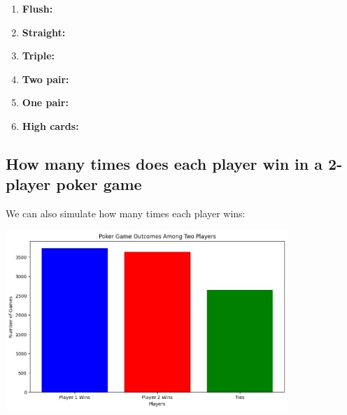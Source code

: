\documentclass{article}
\begin{document}
\begin{enumerate}
\[\begin{aligned}
{\begin{array}{l}
4 \\
1
\end{array}\right)\left[\left(\begin{array}{l}
4 \\
1
\end{array}\right)^4-3\right]} \\
& {[1277 \times 10 \times[6 \times 62+24 \times 63+6 \times 64]]} \\
& +\left[\left(\begin{array}{c}
13 \\
3
\end{array}\right)\left(\begin{array}{c}
4 \\
2
\end{array}\right)^3\left(\begin{array}{c}
40 \\
1
\end{array}\right)\right] \\
&
\end{aligned}
    \]
    \item \textbf{Flush:}
    \item \textbf{Straight:}
    \item \textbf{Triple:}
    \item \textbf{Two pair:}
    \item \textbf{One pair:}
    \item \textbf{High cards:}
\end{enumerate}



\subsection*{How many times does each player win in a 2-player poker game}

We can also simulate how many times each player wins:

\begin{center}
    \includegraphics[width = 0.8\textwidth]{images/win_rate_2_player.png}
\end{center}
\end{document}
